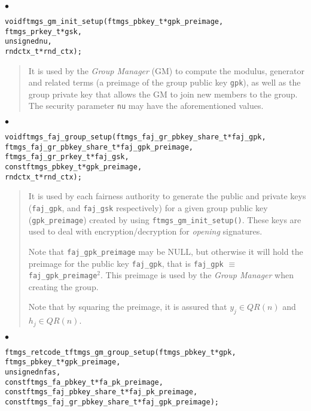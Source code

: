 \documentclass[a4paper]{article}
\newenvironment{api}%
{\noindent$\bullet$\hfill\begin{minipage}[t]{0.97\linewidth}\footnotesize\begin{alltt}}%
{\end{alltt}\end{minipage}}%
\begin{document}
\begin{api}
void ftmgs_gm_init_setup(ftmgs_pbkey_t* gpk_preimage,
                         ftmgs_prkey_t* gsk,
                         unsigned nu,
                         rndctx_t* rnd_ctx);
\end{api}
\begin{quote}\footnotesize
It is used by the \emph{Group Manager} (GM) to compute the modulus,
generator and related terms (a preimage of the group public key
\verb|gpk|), as well as the group private key that allows the GM to
join new members to the group. The security parameter \verb|nu| may
have the aforementioned values.
\end{quote}
\begin{api}
void ftmgs_faj_group_setup(ftmgs_faj_gr_pbkey_share_t* faj_gpk,
                           ftmgs_faj_gr_pbkey_share_t* faj_gpk_preimage,
                           ftmgs_faj_gr_prkey_t* faj_gsk,
                           const ftmgs_pbkey_t* gpk_preimage,
                           rndctx_t* rnd_ctx);
\end{api}
\begin{quote}\footnotesize
It is used by each fairness authority to generate the public and
private keys (\verb|faj_gpk|, and \verb|faj_gsk| respectively) for a
given group public key (\verb|gpk_preimage|) created by using
\verb|ftmgs_gm_init_setup()|. These keys are used to deal with
encryption/decryption for \emph{opening} signatures.

Note that \verb|faj_gpk_preimage| may be NULL, but otherwise it will
hold the preimage for the public key \verb|faj_gpk|, that is 
\verb|faj_gpk| $\equiv$ \verb|faj_gpk_preimage|$^2$. This preimage is
used by the \emph{Group Manager} when creating the group.

Note that by squaring the preimage, it is assured that
$y_j\in\mathit{QR}(n)$ and $h_j\in\mathit{QR}(n)$.
\end{quote}
\begin{api}
ftmgs_retcode_t ftmgs_gm_group_setup(ftmgs_pbkey_t* gpk,
                                     ftmgs_pbkey_t* gpk_preimage,
                                     unsigned nfas,
                                     const ftmgs_fa_pbkey_t* fa_pk_preimage,
                                     const ftmgs_faj_pbkey_share_t* faj_pk_preimage,
                                     const ftmgs_faj_gr_pbkey_share_t* faj_gpk_preimage);
\end{api}
\end{document}
